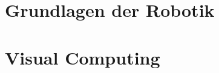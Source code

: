 \documentclass[english, notodo]{fdsummary}
\newcommand{\lstbasepath}{unset}
\begin{document}
	\cleardoublepage
	\part{Grundlagen der Robotik}
	\graphicspath{{./cs/elective/ce/gdr/}}
	\renewcommand{\lstbasepath}{./cs/elective/ce/gdr}
	
	
	\cleardoublepage
	\part{Visual Computing}
	\graphicspath{{./cs/mandatory/fs5/vc/}}
	\renewcommand{\lstbasepath}{./cs/mandatory/fs5/vc}
	
\end{document}
